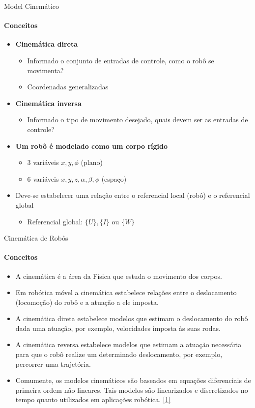 \documentclass{beamer}
\begin{document}
\begin{frame}{Model Cinemático}
    \framesubtitle{Conceitos}
    \begin{itemize}
        \item \textbf{Cinemática direta}
        \begin{itemize}
            \item Informado o conjunto de entradas de controle, como o robô se movimenta?
            \item Coordenadas generalizadas
        \end{itemize} 
        \item \textbf{Cinemática inversa}
        \begin{itemize}
            \item Informado o tipo de movimento desejado,
        quais devem ser as entradas de controle?
        \end{itemize}
        \item \textbf{Um robô é modelado como um corpo rígido}
        \begin{itemize}
            \item 3 variáveis $x, y,\phi$ (plano)
            \item 6 variáveis $x,y,z, \alpha, \beta, \phi$ (espaço)
        \end{itemize}
        \item Deve-se estabelecer uma relação entre o referencial local (robô) e o referencial global
        \begin{itemize}
            \item Referencial global: $\{U\} , \{I\}$ ou $\{W\}$
        \end{itemize}         
    \end{itemize}
\end{frame}


\begin{frame}{Cinemática de Robôs}
    \framesubtitle{Conceitos}
    \begin{itemize}
        \item A cinemática é a área da Física que estuda o movimento dos corpos.
        \item Em robótica móvel a cinemática estabelece relações entre o deslocamento
        (locomoção) do robô e a atuação a ele imposta.
        \item A cinemática direta estabelece modelos que estimam o deslocamento do robô
        dada uma atuação, por exemplo, velocidades imposta às suas rodas.
        \item A cinemática reversa estabelece modelos que estimam a atuação necessária
        para que o robô realize um determinado deslocamento, por exemplo, percorrer
        uma trajetória.
        \item Comumente, os modelos cinemáticos são baseados em equações diferenciais
        de primeira ordem não lineares. Tais modelos são linearizados e discretizados
        no tempo quanto utilizados em aplicações robótica. \href{http://143.106.148.168:9080/Cursos/IA368N/01-16/cinematica2.pdf}{[1]}
    \end{itemize}
\end{frame}
\end{document}
